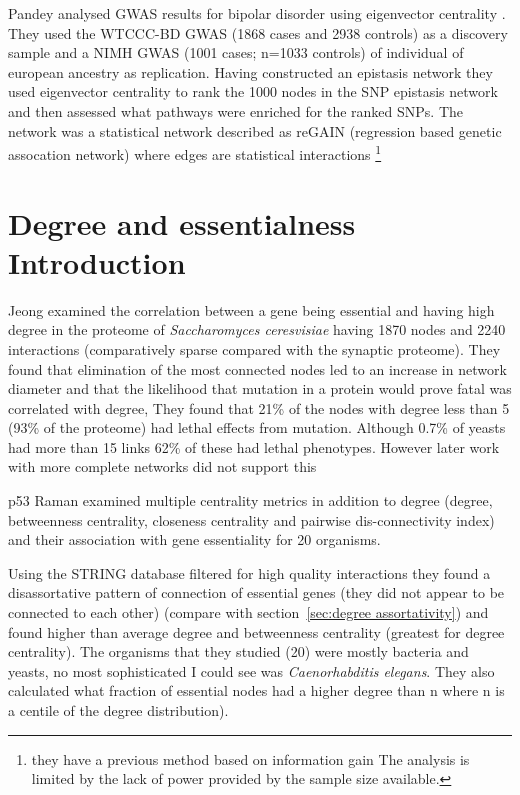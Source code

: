 Pandey analysed GWAS results for bipolar disorder using eigenvector centrality \cite{pandey2012epistasis}. They used the WTCCC-BD GWAS (1868 cases and 2938 controls) as a discovery sample and  a NIMH GWAS (1001 cases; n=1033 controls) of individual of european ancestry as replication. Having constructed an epistasis network they used eigenvector centrality to rank the 1000 nodes in the SNP epistasis network and then assessed what pathways were enriched for the ranked SNPs. The network was a statistical network described as reGAIN (regression based genetic assocation network) where edges are statistical interactions \footnote{they have a previous method based on information gain The analysis is limited by the lack of power provided by the sample size available.}

\section{Degree and essentialness Introduction}
\label{sec:Degree and essentialness}
Jeong \cite{jeong2001lethality} examined the correlation between a gene being essential and having high degree in the proteome of \textit{Saccharomyces ceresvisiae} having 1870 nodes and 2240 interactions (comparatively sparse compared with the synaptic proteome). They found that elimination of the most connected nodes led to an increase in network diameter and that the likelihood that mutation in a protein would prove fatal was correlated with degree, They found that 21\% of the nodes with degree less than 5 (93\% of the proteome) had lethal effects from mutation. Although 0.7\% of yeasts had more than 15 links  62\% of these had lethal phenotypes. However later work with more complete networks did not support this \cite{milenkovic2011dominating} \cite{yu2008high}


p53 
Raman \cite{raman2014organisational} examined multiple centrality metrics in addition to degree (degree, betweenness centrality, closeness centrality and pairwise dis-connectivity index) and their association with gene essentiality for 20 organisms.

 Using the STRING database filtered for high quality interactions they found a disassortative  pattern of connection of essential genes (they did not appear to be connected to each other)  (compare with section~\ref{sec:degree assortativity})  and found higher than average degree and betweenness centrality (greatest for degree centrality). The organisms that they studied (20) were mostly bacteria and yeasts, no most sophisticated I could see was \textit{Caenorhabditis elegans}. They also calculated what fraction of essential nodes had a higher degree than n where n is a centile of the degree distribution).


